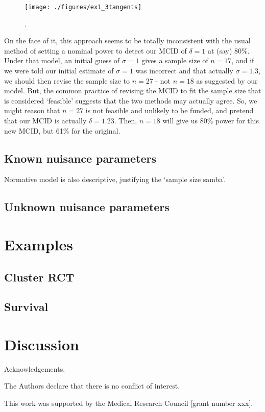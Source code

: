\documentclass[sagev]{sagej}
\begin{document}
\begin{figure}
\centering
\texttt{[image: ./figures/ex1\_3tangents]}
\caption{.}
\label{fig:ex1_3tangents}
\end{figure}

On the face of it, this approach seems to be totally inconsistent with the usual method of setting a nominal power to detect our MCID of $\delta = 1$ at (say) 80\%. Under that model, an initial guess of $\sigma = 1$ gives a sample size of $n = 17$, and if we were told our initial estimate of $\sigma = 1$ was incorrect and that actually $\sigma = 1.3$, we should then revise the sample size to $n = 27$ - not $n = 18$ as suggested by our model. But, the common practice of revising the MCID to fit the sample size that is considered `feasible' suggests that the two methods may actually agree. So, we might reason that $n = 27$ is not feasible and unlikely to be funded, and pretend that our MCID is actually $\delta = 1.23$. Then, $n = 18$ will give us 80\% power for this new MCID, but 61\% for the original.

\subsection{Known nuisance parameters}

Normative model is also descriptive, justifying the `sample size samba'.

\subsection{Unknown nuisance parameters}



\section{Examples}

\subsection{Cluster RCT}

\subsection{Survival}

\section{Discussion}

\begin{acks}
Acknowledgements.
\end{acks}

\begin{dci}
The Authors declare that there is no conflict of interest.
\end{dci}

\begin{funding}
This work was supported by the Medical Research Council [grant number xxx].
\end{funding}



\end{document}
